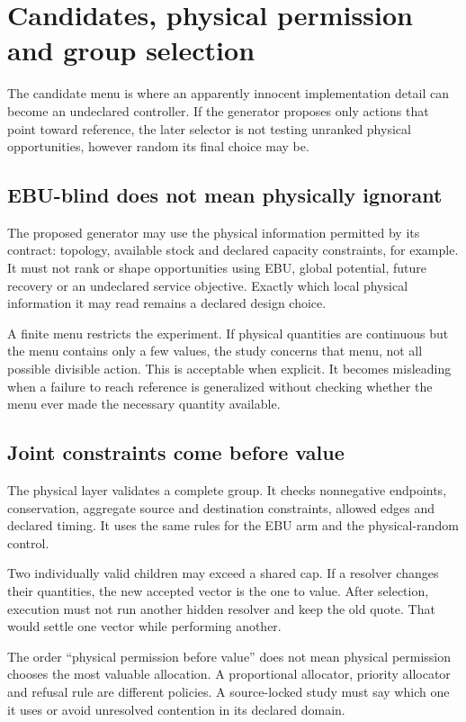 \chapter{Candidates, physical permission and group selection}\label{ch:menus}
The candidate menu is where an apparently innocent implementation detail
can become an undeclared controller. If the generator proposes only actions
that point toward reference, the later selector is not testing unranked
physical opportunities, however random its final choice may be.

\section{EBU-blind does not mean physically ignorant}
The proposed generator may use the physical information permitted by its
contract: topology, available stock and declared capacity constraints, for
example. It must not rank or shape opportunities using EBU, global potential,
future recovery or an undeclared service objective. Exactly which local
physical information it may read remains a declared design choice.

A finite menu restricts the experiment. If physical quantities are continuous
but the menu contains only a few values, the study concerns that menu,
not all possible divisible action. This is acceptable when explicit. It
becomes misleading when a failure to reach reference is generalized without
checking whether the menu ever made the necessary quantity available.

\section{Joint constraints come before value}
The physical layer validates a complete group. It checks nonnegative
endpoints, conservation, aggregate source and destination constraints,
allowed edges and declared timing. It uses the same rules for the EBU arm
and the physical-random control.

Two individually valid children may exceed a shared cap. If a resolver
changes their quantities, the new accepted vector is the one to value.
After selection, execution must not run another hidden resolver and keep
the old quote. That would settle one vector while performing another.

The order ``physical permission before value'' does not mean physical
permission chooses the most valuable allocation. A proportional allocator,
priority allocator and refusal rule are different policies. A source-locked
study must say which one it uses or avoid unresolved contention in its
declared domain.

